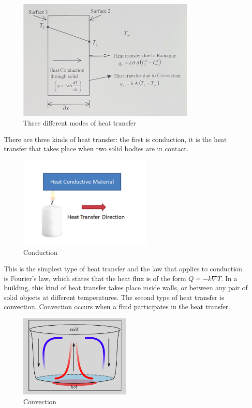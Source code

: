  \begin{figure}[H]
        \centering
		\includegraphics[width=0.8\textwidth]{"images/enkf/flux_1.png"}
		\caption{Three different modes of heat transfer}
\end{figure}
\newline\noindent There are three kinds of heat transfer:  the first is conduction, it is the heat transfer that takes place when two solid bodies are in contact. 
 \begin{figure}[H]
        \centering
		\includegraphics[width=0.6\textwidth]{"images/enkf/flux_2.png"}
		\caption{Conduction}
\end{figure}
\noindent 
This is the simplest type of heat transfer and the law that applies to conduction is Fourier's law, which states that the heat flux is of the form $Q=-k\nabla T$. In a building, this kind of heat transfer takes place inside walls, or between any pair of solid objects at different temperatures.
\newline\noindent The second type of heat transfer is convection. Convection occurs when a fluid participates in the heat transfer.
\begin{figure}[H]
        \centering
		\includegraphics[width=0.5\textwidth]{"images/enkf/flux_5.png"}
		\caption{Convection}
\end{figure}
